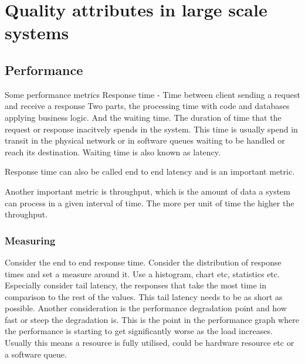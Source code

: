 \chapter{Quality attributes in large scale systems}


\section{Performance}
Some performance metrics
Response time - Time between client sending a request and receive a response
Two parts, the processing time with code and databases applying business logic.
And the waiting time.
The duration of time that the request or response inacitvely spends in the system.
This time is usually spend in transit in the physical network or in software queues waiting to be handled or reach its destination.
Waiting time is also known as latency.

Response time can also be called end to end latency and is an important metric.

Another important metric is throughput, which is the amount of data a system can process in a given interval of time.
The more per unit of time the higher the throughput.

\subsection{Measuring}
Consider the end to end response time.
Consider the distribution of response times and set a measure around it.
Use a histogram, chart etc, statistics etc.
Especially consider tail latency, the responses that take the most time in comparison to the rest of the values.
This tail latency needs to be as short as possible.
Another consideration is the performance degradation point and how fast or steep the degradation is.
This is the point in the performance graph where the performance is starting to get significantly worse as the load increases.
Usually this means a resource is fully utilised, could be hardware resource etc or a software queue.


